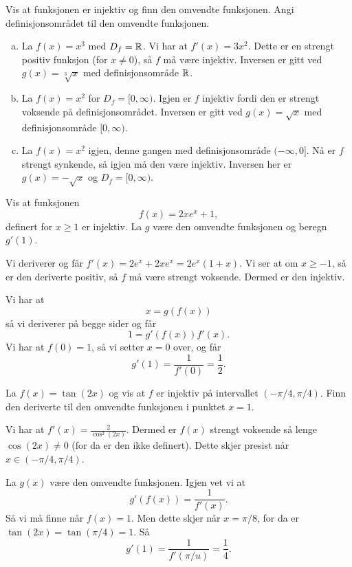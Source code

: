 \documentclass[11pt, norsk]{article}
\begin{document}
\begin{oppg}[7.4.1]
Vis at funksjonen er injektiv og finn den omvendte funksjonen. Angi definisjonsområdet til den omvendte funksjonen.
\end{oppg}
\begin{losn}
\begin{enumerate}[a)]
\item La $f(x)=x^3$ med $D_f=\mathbb{R}$. Vi har at $f'(x)=3x^2$. Dette er en strengt positiv funksjon (for $x\neq 0$), så $f$ må være injektiv. Inversen er gitt ved $g(x)=\sqrt[3]{x}$ med definisjonsområde $\mathbb{R}$.
\item La $f(x)=x^2$ for $D_f=[0, \infty)$. Igjen er $f$ injektiv fordi den er strengt voksende på definisjonsområdet. Inversen er gitt ved $g(x) = \sqrt{x}$ med definisjonsområde $[0,\infty)$.
\item La $f(x)=x^2$ igjen, denne gangen med definisjonsområde $(-\infty,0]$. Nå er $f$ strengt synkende, så igjen må den være injektiv. Inversen her er $g(x)=-\sqrt{x}$ og $D_f=[0, \infty)$. 
\end{enumerate}
\end{losn}

\begin{oppg}[7.4.3]
Vis at funksjonen
$$
f(x) = 2xe^x + 1,
$$
definert for $x \geq 1$ er injektiv. La $g$ være den omvendte funksjonen og beregn $g'(1)$.
\end{oppg}
\begin{losn}
Vi deriverer og får $f'(x) = 2e^x+2xe^x=2e^x(1+x)$. Vi ser at om $x \geq -1$, så er den deriverte positiv, så $f$ må være strengt voksende. Dermed er den injektiv. 

Vi har at 
$$
x=g(f(x))
$$
så vi deriverer på begge sider og får 
$$
1 = g'(f(x))f'(x).
$$
Vi har at $f(0)=1$, så vi setter $x=0$ over, og får
$$
g'(1)=\frac{1}{f'(0)}=\frac{1}{2}.
$$
\end{losn}

\begin{oppg}[7.4.5]
La $f(x)=\tan(2x)$ og vis at $f$ er injektiv på intervallet $(-\pi/4,\pi/4)$. Finn den deriverte til den omvendte funksjonen i punktet $x=1$.
\end{oppg}
\begin{losn}
Vi har at $f'(x) = \frac{2}{\cos^2(2x)}$. Dermed er $f(x)$ strengt voksende så lenge $\cos(2x) \neq 0$ (for da er den ikke definert). Dette skjer presist når $x \in (-\pi/4,\pi/4)$.

La $g(x)$ være den omvendte funksjonen. Igjen vet vi at
$$
g'(f(x)) = \frac{1}{f'(x)}.
$$
Så vi må finne når $f(x)=1$. Men dette skjer når $x=\pi/8$, for da er $\tan(2x)=\tan(\pi/4)=1$. Så
$$
g'(1)=\frac{1}{f'(\pi/u)} = \frac 14.
$$
\end{losn}
\end{document}
